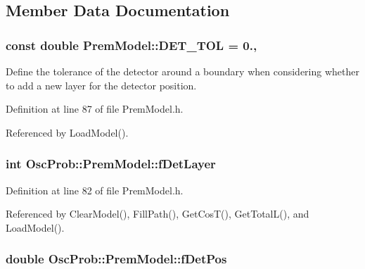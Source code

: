 \subsection{Member Data Documentation}
\subsubsection[{\texorpdfstring{D\+E\+T\+\_\+\+T\+OL}{DET_TOL}}]{\setlength{\rightskip}{0pt plus 5cm}const double Prem\+Model\+::\+D\+E\+T\+\_\+\+T\+OL = 0.\hspace{0.3cm}{\ttfamily [static]}, {\ttfamily [protected]}}\hypertarget{classOscProb_1_1PremModel_a8ad1335ebe80ee1cd1cdf59d774ab34b}{}\label{classOscProb_1_1PremModel_a8ad1335ebe80ee1cd1cdf59d774ab34b}
Define the tolerance of the detector around a boundary when considering whether to add a new layer for the detector position. 

Definition at line 87 of file Prem\+Model.\+h.



Referenced by Load\+Model().

\subsubsection[{\texorpdfstring{f\+Det\+Layer}{fDetLayer}}]{\setlength{\rightskip}{0pt plus 5cm}int Osc\+Prob\+::\+Prem\+Model\+::f\+Det\+Layer\hspace{0.3cm}{\ttfamily [protected]}}\hypertarget{classOscProb_1_1PremModel_a4fb68506493666349f418b893a996185}{}\label{classOscProb_1_1PremModel_a4fb68506493666349f418b893a996185}


Definition at line 82 of file Prem\+Model.\+h.



Referenced by Clear\+Model(), Fill\+Path(), Get\+Cos\+T(), Get\+Total\+L(), and Load\+Model().

\subsubsection[{\texorpdfstring{f\+Det\+Pos}{fDetPos}}]{\setlength{\rightskip}{0pt plus 5cm}double Osc\+Prob\+::\+Prem\+Model\+::f\+Det\+Pos\hspace{0.3cm}{\ttfamily [protected]}}\hypertarget{classOscProb_1_1PremModel_ab12ea0343cd11b9233ffd20ab5e620c7}{}\label{classOscProb_1_1PremModel_ab12ea0343cd11b9233ffd20ab5e620c7}


